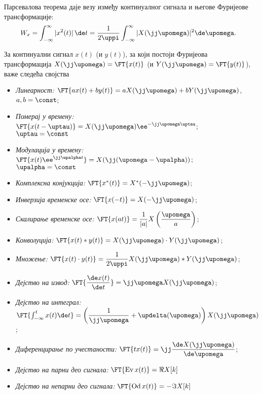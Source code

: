 \noindent 
Парсевалова теорема даје везу између  континуалног сигнала и његове
Фуријеове трансформације:
\begin{equation}
W_x = \int_{-\infty}^{\infty} |x^2(t)|\,\de t = \dfrac{1}{2\uppi}\int_{-\infty}^{\infty} |X(\jj\upomega)|^2 \de \upomega. \label{s:ctft:parseval}
\end{equation}


За континуални сигнал $x(t)$ (и $y(t)$), за који постоји Фуријеова трансформација
$X(\jj\upomega) = \FT{x(t)}$ (и $Y(\jj\upomega) = \FT{y(t)}$), важе следећа својства
\begin{itemize}
    \item \emph{Линеарност:} $\FT{ax(t) + by(t)} = a X(\jj\upomega) + b Y(\jj\upomega)$, \qquad $a,b = \const$;
    \item \emph{Померај у времену:} $\FT{x(t-\uptau)} = X(\jj\upomega) \ee^{-\jj\upomega \uptau}$; \qquad $\uptau = \const$
    \item \emph{Модулација у времену:} $\FT{x(t) \ee^{\jj\upalpha t}} = X(\jj(\upomega - \upalpha))$; \qquad $\upalpha = \const$
    \item \emph{Комплексна конјукција:} $\FT{x^{\ast}(t) } = X^{\ast}(-\jj\upomega)$; 
    \item \emph{Инверзија временске осе:} $\FT{x(-t) } = X(-\jj\upomega)$; 
    \item \emph{Скалирање временске осе:} $\FT{x(at)} = \dfrac{1}{|a|} X\left( \dfrac{\upomega}{a} \right)$;
    \item \emph{Конволуција:} $\FT{x(t) \ast y(t)} = X(\jj\upomega) \cdot Y(\jj\upomega)$; 
    \item \emph{Множење:} $\FT{x(t) \cdot y(t)} = \dfrac{1}{2\uppi} X(\jj\upomega) \ast Y(\jj\upomega)$; 
    \item \emph{Дејство на извод:} $ \FT{ \dfrac{ \de x(t)}{\de t}} = \jj\upomega X(\jj\upomega)$;
    \item \emph{Дејство на интеграл:} $ \FT{ \int_{-\infty}^{t} x(t) \de t} =  
    \left( 
        \dfrac{1}{\jj\upomega} + \updelta(\upomega)
    \right) X(\jj\upomega)$;
    \item \emph{Диференцирање по учестаности:} 
    $
    \FT{ t x(t) } = \jj \dfrac{\de X(\jj\upomega)}{\de \upomega}
    $;
    \item \emph{Дејство на парни део сигнала:}
    $
    \FT{ \operatorname{Ev}x(t)} = \Re{X[k]}
    $
    \item \emph{Дејство на непарни део сигнала:}
    $
    \FT{ \operatorname{Od}x(t)} = -\Im{X[k]}
    $
    
\end{itemize} 


